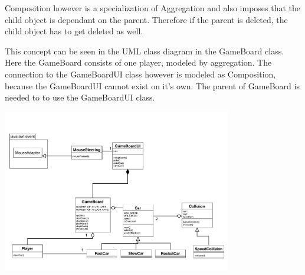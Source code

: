 \documentclass[a4paper, 10pt]{article}
\begin{document}
\begin{enumerate}
        Composition however is a specialization of Aggregation and also imposes that 
        the child object is dependant on the parent. Therefore if the parent is deleted, 
        the child object has to get deleted as well.

        This concept can be seen in the UML class diagram in the GameBoard class.
        Here the GameBoard consists of one player, modeled by aggregation.
        The connection to the GameBoardUI class however is modeled as Composition, 
        because the GameBoardUI cannot exist on it's own. The parent of GameBoard is needed to 
        to use the GameBoardUI class.

        \includegraphics[width=10cm] {../sheet02/object_model.pdf}

\end{enumerate}
\end{document}
